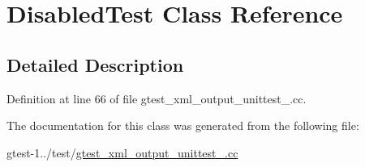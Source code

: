 \hypertarget{classDisabledTest}{\section{\-Disabled\-Test \-Class \-Reference}
\label{d5/d5e/classDisabledTest}
}


\subsection{\-Detailed \-Description}


\-Definition at line 66 of file gtest\-\_\-xml\-\_\-output\-\_\-unittest\-\_\-.\-cc.



\-The documentation for this class was generated from the following file\-:\begin{DoxyCompactItemize}
\item 
gtest-\/1../test/\hyperlink{gtest__xml__output__unittest___8cc}{gtest\-\_\-xml\-\_\-output\-\_\-unittest\-\_\-.\-cc}\end{DoxyCompactItemize}
